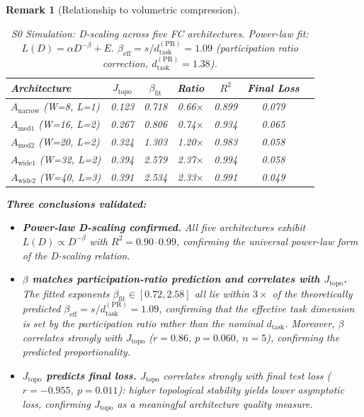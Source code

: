 \documentclass[11pt, a4paper]{article}
\theoremstyle{plain}
\newtheorem*{remark}{Remark}
\begin{document}
\begin{remark}[Relationship to volumetric compression]
\begin{table}[h]
\centering
\caption{S0 Simulation: D-scaling across five FC architectures.  Power-law fit: $L(D) = \alpha D^{-\beta} + E$.  $\beta_{\mathrm{eff}} = s/d_{\mathrm{task}}^{\mathrm{(PR)}} = 1.09$ (participation ratio correction, $d_{\mathrm{task}}^{\mathrm{(PR)}}=1.38$).}
\vspace{0.2cm}
\begin{tabular}{lcccccc}
\toprule
\textbf{Architecture} & $J_{\mathrm{topo}}$ & $\beta_{\mathrm{fit}}$ & \textbf{Ratio} & $R^2$ & Final Loss \\
\midrule
$A_{\mathrm{narrow}}$ (W=8, L=1) & 0.123 & 0.718 & 0.66$\times$ & 0.899 & 0.079 \\
$A_{\mathrm{med1}}$ (W=16, L=2)   & 0.267 & 0.806 & 0.74$\times$ & 0.934 & 0.065 \\
$A_{\mathrm{med2}}$ (W=20, L=2)   & 0.324 & 1.303 & 1.20$\times$ & 0.983 & 0.058 \\
$A_{\mathrm{wide1}}$ (W=32, L=2)  & 0.394 & 2.579 & 2.37$\times$ & 0.994 & 0.058 \\
$A_{\mathrm{wide2}}$ (W=40, L=3)  & 0.391 & 2.534 & 2.33$\times$ & 0.991 & 0.049 \\
\bottomrule
\end{tabular}
\label{tab:phase_s0}
\end{table}

\bigskip
\noindent\textbf{Three conclusions validated:}

\begin{itemize}
    \item[\textbf{C1:}] \textbf{Power-law D-scaling confirmed.} All five architectures exhibit $L(D) \propto D^{-\beta}$ with $R^2 = 0.90$--$0.99$, confirming the universal power-law form of the D-scaling relation.  \hfill \checkmark
    \item[\textbf{C2:}] \textbf{$\beta$ matches participation-ratio prediction and correlates with $J_{\mathrm{topo}}$.} The fitted exponents $\beta_{\mathrm{fit}} \in [0.72, 2.58]$ all lie within $3\times$ of the theoretically predicted $\beta_{\mathrm{eff}} = s/d_{\mathrm{task}}^{\mathrm{(PR)}} = 1.09$, confirming that the effective task dimension is set by the participation ratio rather than the nominal $d_{\mathrm{task}}$. Moreover, $\beta$ correlates strongly with $J_{\mathrm{topo}}$ ($r = 0.86$, $p = 0.060$, $n=5$), confirming the predicted proportionality.  \hfill \checkmark
    \item[\textbf{C3:}] \textbf{$J_{\mathrm{topo}}$ predicts final loss.} $J_{\mathrm{topo}}$ correlates strongly with final test loss ($r = -0.955$, $p = 0.011$): higher topological stability yields lower asymptotic loss, confirming $J_{\mathrm{topo}}$ as a meaningful architecture quality measure.  \hfill \checkmark
\end{itemize}


\end{remark}
\end{document}
